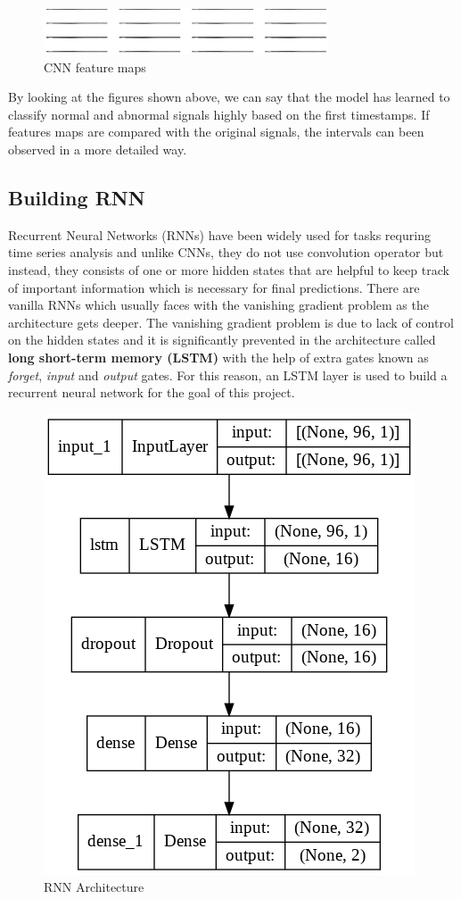 \documentclass[a4paper]{article}
\begin{document}
\begin{figure}[h]
	\centering
	\includegraphics[width=0.75\textwidth]{img/cnn_feature_maps.png}
	\caption{CNN feature maps}
	\label{fig:cnn_feature_maps}
\end{figure}

By looking at the figures shown above, we can say that the model has learned to classify normal and abnormal signals highly based on the first timestamps. If features maps are compared with the original signals, 
the intervals can been observed in a more detailed way.

\subsection{Building RNN}
Recurrent Neural Networks (RNNs) have been widely used for tasks requring time series analysis and unlike CNNs, they do not use convolution operator but instead, they consists of one or more hidden states 
that are helpful to keep track of important information which is necessary for final predictions. There are vanilla RNNs which usually faces with the vanishing gradient problem as the architecture gets 
deeper. The vanishing gradient problem is due to lack of control on the hidden states and it is significantly prevented in the architecture called \textbf{long short-term memory (LSTM)} with the help of 
extra gates known as \textit{forget}, \textit{input} and \textit{output} gates. For this reason, an LSTM layer is used to build a recurrent neural network for the goal of this project.

\begin{figure}[h]
	\centering
	\includegraphics[height=0.4\textwidth]{img/rnn_arch.png}
	\caption{RNN Architecture}
	\label{fig:rnn_arch}
\end{figure}
\end{document}
